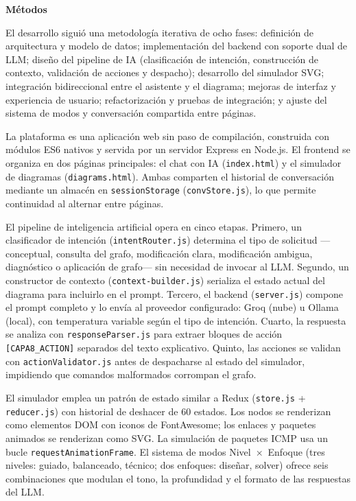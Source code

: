\documentclass[12pt,letterpaper]{article}
\begin{document}
\textbf{Métodos}

El desarrollo siguió una metodología iterativa de ocho fases: definición de arquitectura y modelo de datos; implementación del backend con soporte dual de LLM; diseño del pipeline de IA (clasificación de intención, construcción de contexto, validación de acciones y despacho); desarrollo del simulador SVG; integración bidireccional entre el asistente y el diagrama; mejoras de interfaz y experiencia de usuario; refactorización y pruebas de integración; y ajuste del sistema de modos y conversación compartida entre páginas.

La plataforma es una aplicación web sin paso de compilación, construida con módulos ES6 nativos y servida por un servidor Express en Node.js. El frontend se organiza en dos páginas principales: el chat con IA (\texttt{index.html}) y el simulador de diagramas (\texttt{diagrams.html}). Ambas comparten el historial de conversación mediante un almacén en \texttt{sessionStorage} (\texttt{convStore.js}), lo que permite continuidad al alternar entre páginas.

El pipeline de inteligencia artificial opera en cinco etapas. Primero, un clasificador de intención (\texttt{intentRouter.js}) determina el tipo de solicitud —conceptual, consulta del grafo, modificación clara, modificación ambigua, diagnóstico o aplicación de grafo— sin necesidad de invocar al LLM. Segundo, un constructor de contexto (\texttt{context-builder.js}) serializa el estado actual del diagrama para incluirlo en el prompt. Tercero, el backend (\texttt{server.js}) compone el prompt completo y lo envía al proveedor configurado: Groq (nube) u Ollama (local), con temperatura variable según el tipo de intención. Cuarto, la respuesta se analiza con \texttt{responseParser.js} para extraer bloques de acción \texttt{[CAPA8\_ACTION]} separados del texto explicativo. Quinto, las acciones se validan con \texttt{actionValidator.js} antes de despacharse al estado del simulador, impidiendo que comandos malformados corrompan el grafo.

El simulador emplea un patrón de estado similar a Redux (\texttt{store.js} + \texttt{reducer.js}) con historial de deshacer de 60 estados. Los nodos se renderizan como elementos DOM con iconos de FontAwesome; los enlaces y paquetes animados se renderizan como SVG. La simulación de paquetes ICMP usa un bucle \texttt{requestAnimationFrame}. El sistema de modos Nivel~×~Enfoque (tres niveles: guiado, balanceado, técnico; dos enfoques: diseñar, solver) ofrece seis combinaciones que modulan el tono, la profundidad y el formato de las respuestas del LLM.
\end{document}
